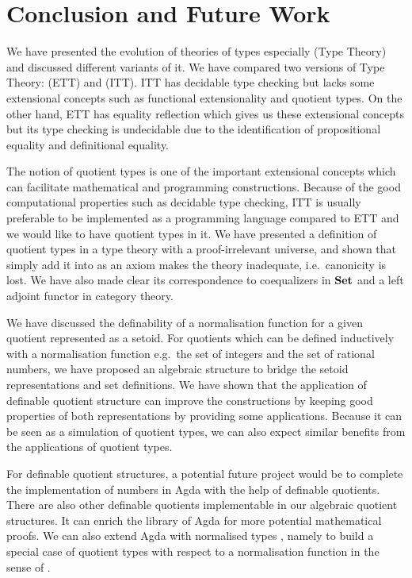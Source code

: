 \chapter{Conclusion and Future Work}

We have presented the evolution of theories of types especially \mltt (Type Theory) and discussed different variants of it.  We have compared two versions of Type Theory: \ett (ETT) and \itt (ITT). ITT has decidable type checking but lacks some extensional concepts such as functional extensionality and quotient types. On the other hand,  ETT has equality reflection which gives us these extensional concepts but its type checking is undecidable due to the identification of propositional equality and definitional equality.


The notion of quotient types is one of the important extensional concepts which can facilitate mathematical and programming constructions. Because of the good computational properties such as decidable type checking, ITT is usually preferable to be implemented as a programming language compared to ETT and we would like to have quotient types in it. We have presented a definition of quotient types in a type theory with a proof-irrelevant universe, and shown that simply add it into \itt as an axiom makes the theory inadequate, i.e.\ canonicity is lost. We have also made clear its correspondence to coequalizers in $\operatorname{\mathbf{Set}}$ and a left adjoint functor in category theory.


We have discussed the definability of a normalisation function for a given quotient represented as a setoid. For quotients which can be defined inductively with a normalisation function e.g.\ the set of integers and the set of rational numbers, we have proposed an algebraic structure to bridge the setoid representations and set definitions.
We have shown that the application of definable quotient structure can improve the constructions by keeping good properties of both representations by providing some applications. Because it can be seen as a simulation of quotient types, we can also expect similar benefits from the applications of quotient types.


For definable quotient structures, a potential future project would be to complete the implementation of numbers in Agda with the help of definable quotients. There are also other definable quotients implementable in our algebraic quotient structures. It can enrich the library of Agda for more potential mathematical proofs. We can also extend Agda with normalised types \cite{cou:01}, namely to build a special case of quotient types with respect to a normalisation function in the sense of . 

